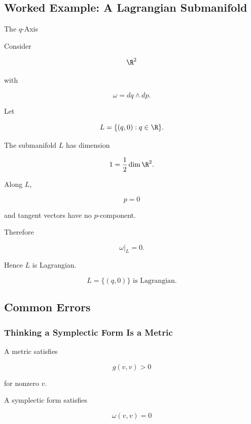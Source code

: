 \subsection{Worked Example: A Lagrangian Submanifold}
\label{subsec:worked-lagrangian}

\begin{workedexamplebox}{The \(q\)-Axis}

Consider

\[
\R^2
\]

with

\[
\omega=dq\wedge dp.
\]

Let

\[
L=\{(q,0):q\in\R\}.
\]

The submanifold \(L\) has dimension

\[
1=\frac12\dim\R^2.
\]

Along \(L\),

\[
p=0
\]

and tangent vectors have no \(p\)-component.

Therefore

\[
\omega|_L=0.
\]

Hence \(L\) is Lagrangian.

\begin{answerbox}
\[
\boxed{
L=\{(q,0)\}
\text{ is Lagrangian.}
}
\]
\end{answerbox}
\end{workedexamplebox}

\subsection{Common Errors}
\label{subsec:symplectic-common-errors}

\subsubsection{Thinking a Symplectic Form Is a Metric}

A metric satisfies

\[
g(v,v)>0
\]

for nonzero \(v\).

A symplectic form satisfies

\[
\boxed{
\omega(v,v)=0
}
\]

